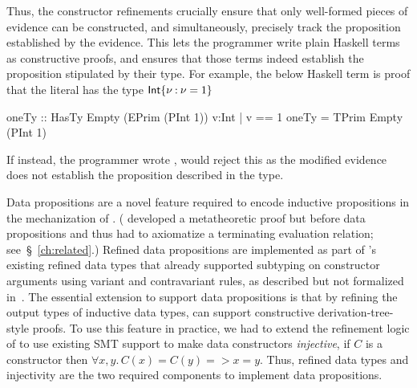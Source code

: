 \begin{fullversion}

%
Thus, the constructor refinements crucially ensure that only well-formed pieces of evidence
can be constructed, and simultaneously, precisely track the proposition established
by the evidence.
%
This lets the programmer write plain Haskell terms as constructive proofs, and \lh ensures
that those terms indeed establish the proposition stipulated by their type.
%
For example, the below Haskell term is proof that the literal  has the type
${{{\sf Int}}\{\nu \mathbin{:} \nu = 1\}}$
%
\begin{mcode}
  oneTy :: HasTy Empty (EPrim (PInt 1)) {v:Int | v == 1}
  oneTy = TPrim Empty (PInt 1)
\end{mcode}
%
If instead, the programmer wrote
, \lh would reject  
this
as the modified evidence does not establish
the proposition described in the type.
%
\end{fullversion}


Data propositions are a novel feature required to encode 
inductive propositions in
the mechanization of \sysrf. 
(\citet{lweb} developed a \lh metatheoretic proof  
but before data propositions and thus had to axiomatize a terminating 
evaluation relation; see~\S~\ref{ch:related}.)
%
Refined data propositions are implemented as part of \lh's existing 
refined data types that already supported subtyping on constructor arguments 
using variant and contravariant rules, as described but not formalized in~\cite{sprite}. 
The essential extension to support data propositions is that by refining the output types 
of inductive data types, \lh can support constructive derivation-tree-style proofs.
%
To use this feature in practice, we had to extend the refinement logic 
of \lh to use existing SMT support to make data constructors \emph{injective}, 
\ie if $C$ is a constructor then $\forall x, y.\, C(x) = C(y) => x = y$.
Thus, refined data types and injectivity are the two required 
components to implement data propositions.

